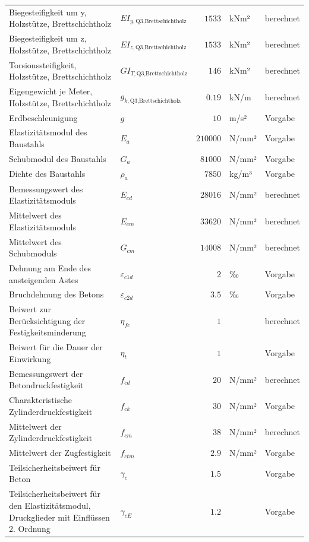 \documentclass[11pt,a4paper]{article}
\begin{document}
\begin{xltabular}{\linewidth}{>{\raggedright\arraybackslash}Xlrll}
Biegesteifigkeit um y, Holzstütze, Brettschichtholz & $EI_{y,\text{Q3,Brettschichtholz}}$ & $1533$ & kNm² & berechnet \\
Biegesteifigkeit um z, Holzstütze, Brettschichtholz & $EI_{z,\text{Q3,Brettschichtholz}}$ & $1533$ & kNm² & berechnet \\
Torsionssteifigkeit, Holzstütze, Brettschichtholz & $GI_{T,\text{Q3,Brettschichtholz}}$ & $146$ & kNm² & berechnet \\
Eigengewicht je Meter, Holzstütze, Brettschichtholz & $g_{k,\text{Q3,Brettschichtholz}}$ & $0.19$ & kN/m & berechnet \\
Erdbeschleunigung & $g$ & $10$ & m/s² & Vorgabe \\
Elastizitätsmodul des Baustahls & $E_a$ & $210000$ & N/mm² & Vorgabe \\
Schubmodul des Baustahls & $G_a$ & $81000$ & N/mm² & Vorgabe \\
Dichte des Baustahls & $\rho_a$ & $7850$ & kg/m³ & Vorgabe \\
Bemessungswert des Elastizitätsmoduls & $E_{cd}$ & $28016$ & N/mm² & berechnet \\
Mittelwert des Elastizitätsmoduls & $E_{cm}$ & $33620$ & N/mm² & berechnet \\
Mittelwert des Schubmoduls & $G_{cm}$ & $14008$ & N/mm² & berechnet \\
Dehnung am Ende des ansteigenden Astes & $\varepsilon_{c1d}$ & $2$ & ‰ & Vorgabe \\
Bruchdehnung des Betons & $\varepsilon_{c2d}$ & $3.5$ & ‰ & Vorgabe \\
Beiwert zur Berücksichtigung der Festigkeitsminderung & $\eta_{fc}$ & $1$ &  & berechnet \\
Beiwert für die Dauer der Einwirkung & $\eta_t$ & $1$ &  & Vorgabe \\
Bemessungswert der Betondruckfestigkeit & $f_{cd}$ & $20$ & N/mm² & berechnet \\
Charakteristische Zylinderdruckfestigkeit & $f_{ck}$ & $30$ & N/mm² & Vorgabe \\
Mittelwert der Zylinderdruckfestigkeit & $f_{cm}$ & $38$ & N/mm² & berechnet \\
Mittelwert der Zugfestigkeit & $f_{ctm}$ & $2.9$ & N/mm² & Vorgabe \\
Teilsicherheitsbeiwert für Beton & $\gamma_c$ & $1.5$ &  & Vorgabe \\
Teilsicherheitsbeiwert für den Elastizitätsmodul, Druckglieder mit Einflüssen 2. Ordnung & $\gamma_{cE}$ & $1.2$ &  & Vorgabe \\

\end{xltabular}
\end{document}
